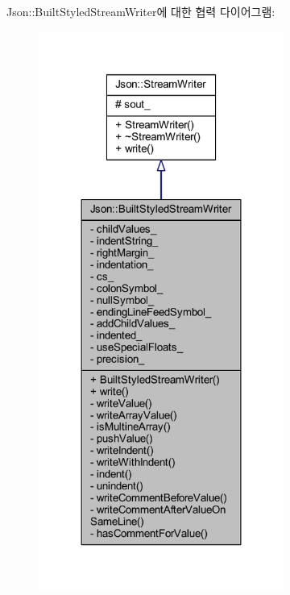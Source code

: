 Json\+:\+:Built\+Styled\+Stream\+Writer에 대한 협력 다이어그램\+:\nopagebreak
\begin{figure}[H]
\begin{center}
\leavevmode
\includegraphics[width=228pt]{struct_json_1_1_built_styled_stream_writer__coll__graph}
\end{center}
\end{figure}
